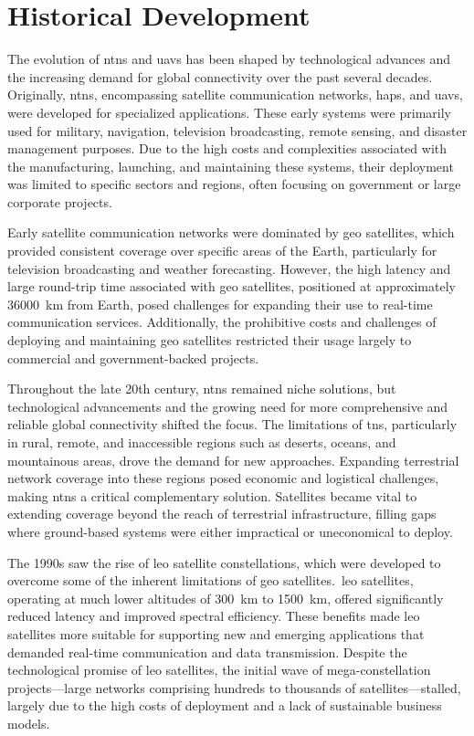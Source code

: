 \chapter{Historical Development}\label{ch:historical_development}

The evolution of \glspl{ntn} and \glspl{uav} has been shaped by technological advances and the increasing demand for global connectivity over the past several decades. Originally, \glspl{ntn}, encompassing satellite communication networks, \glspl{hap}, and \glspl{uav}, were developed for specialized applications. These early systems were primarily used for military, navigation, television broadcasting, remote sensing, and disaster management purposes. Due to the high costs and complexities associated with the manufacturing, launching, and maintaining these systems, their deployment was limited to specific sectors and regions, often focusing on government or large corporate projects.

Early satellite communication networks were dominated by \gls{geo} satellites, which provided consistent coverage over specific areas of the Earth, particularly for television broadcasting and weather forecasting. However, the high latency and large round-trip time associated with \gls{geo} satellites, positioned at approximately \SI{36000}{\kilo\meter} from Earth, posed challenges for expanding their use to real-time communication services. Additionally, the prohibitive costs and challenges of deploying and maintaining \gls{geo} satellites restricted their usage largely to commercial and government-backed projects.

Throughout the late 20th century, \glspl{ntn} remained niche solutions, but technological advancements and the growing need for more comprehensive and reliable global connectivity shifted the focus. The limitations of \glspl{tn}, particularly in rural, remote, and inaccessible regions such as deserts, oceans, and mountainous areas, drove the demand for new approaches. Expanding terrestrial network coverage into these regions posed economic and logistical challenges, making \glspl{ntn} a critical complementary solution. Satellites became vital to extending coverage beyond the reach of terrestrial infrastructure, filling gaps where ground-based systems were either impractical or uneconomical to deploy.

The 1990s saw the rise of \gls{leo} satellite constellations, which were developed to overcome some of the inherent limitations of \gls{geo} satellites.\ \gls{leo} satellites, operating at much lower altitudes of \SI{300}{\kilo\meter} to \SI{1500}{\kilo\meter}, offered significantly reduced latency and improved spectral efficiency. These benefits made \gls{leo} satellites more suitable for supporting new and emerging applications that demanded real-time communication and data transmission. Despite the technological promise of \gls{leo} satellites, the initial wave of mega-constellation projects—large networks comprising hundreds to thousands of satellites—stalled, largely due to the high costs of deployment and a lack of sustainable business models.

